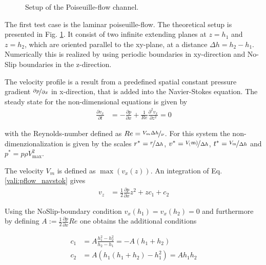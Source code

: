 \begin{figure}[!bp]
  \begin{minipage}[c]{0.6\textwidth}
      \centering
  \end{minipage}
  \begin{minipage}[c]{0.3\textwidth}
      \caption{Setup of the Poiseuille-flow channel.
      \label{validation:setup_pf}
      }
  \end{minipage}
\end{figure}

The first test case is the laminar poiseuille-flow. The theoretical setup is presented in Fig. \ref{validation:setup_pf}.
It consist of two infinite extending  planes at $z=h_1$ and $z=h_2$, which are oriented
parallel to the xy-plane, at a distance $\Delta h = h_2 - h_1$.
Numerically this is realized by using periodic boundaries in xy-direction and
No-Slip boundaries in the z-direction.

The velocity profile is a result from a predefined spatial constant pressure gradient $\nicefrac{\partial p}{\partial x}$
 in x-direction, that is added into the Navier-Stokes equation.
The steady state for the non-dimensional equations is given by \citep{}
\begin{align}
    \label{vali:pflow_navstok}
    \frac{\partial v_x}{\partial t} &= - \frac{\partial p}{\partial x}
     + \frac{1}{Re} \frac{\partial^2 v_x}{\partial z^2} = 0
\end{align}

with the Reynolds-number defined as $Re = \nicefrac{V_{m}\Delta h}{\nu}$.
For this system the non-dimenzionalization is given by the scales
    $r^* = \nicefrac{r}{\Delta h}$, $v^*=\nicefrac{V_(\text{m})}{\Delta h}$,
    $t^* = \nicefrac{V_{\text{m}}}{\Delta h}$ and $p^* = p \rho V_{\text{max}}^2$.

The velocity $V_m$ is defined as $\max(v_x(z))$.
An integration of Eq. \ref{vali:pflow_navstok} gives
\begin{align}
v_z &= \frac{1}{2}\frac{\partial p}{\partial x}z^2 + zc_1 + c_2
\end{align}

Using the NoSlip-boundary condition $v_x(h_1) = v_x(h_2) = 0$ and furthermore by defining
$A:=\frac{1}{2}\frac{\partial p}{\partial x} Re$ one obtains the additional conditions

\begin{align}
c_1 &= A\frac{h_1^2 -h_2^2}{h_2 - h_1} = -A(h_1+h_2)\\
c_2 &= A(h_1(h_1 + h_2) - h_1^2) = Ah_1h_2
\end{align}

